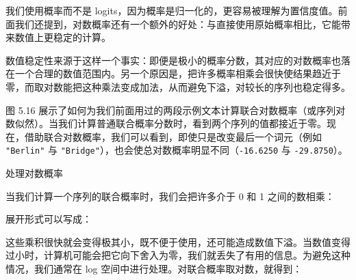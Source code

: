 
我们使用概率而不是 logits，因为概率是归一化的，更容易被理解为置信度值。前面我们还提到，对数概率还有一个额外的好处：与直接使用原始概率相比，它能带来数值上更稳定的计算。

数值稳定性来源于这样一个事实：即便是极小的概率分数，其对应的对数概率也落在一个合理的数值范围内。另一个原因是，把许多概率相乘会很快使结果趋近于零，而取对数能把这种乘法变成加法，从而避免下溢，对较长的序列也稳定得多。

图 5.16 展示了如何为我们前面用过的两段示例文本计算联合对数概率（或序列对数似然）。当我们计算普通联合概率分数时，看到两个序列的值都接近于零。现在，借助联合对数概率，我们可以看到，即使只是改变最后一个词元（例如 \texttt{"}\texttt{Berlin}\texttt{"} 与 \texttt{"}\texttt{Bridge}\texttt{"}），也会使总对数概率明显不同（\texttt{-16.6250} 与 \texttt{-29.8750}）。


\begin{mySidebar}{处理对数概率}

当我们计算一个序列的联合概率时，我们会把许多介于 0 和 1 之间的数相乘：

\end{mySidebar}


\begin{mySidebarBox}

展开形式可以写成：

\end{mySidebarBox}


\begin{mySidebarBox}

这些乘积很快就会变得极其小，既不便于使用，还可能造成数值下溢。当数值变得过小时，计算机可能会把它向下舍入为零，我们就丢失了有用的信息。为避免这种情况，我们通常在 log 空间中进行处理。对联合概率取对数，就得到：

\end{mySidebarBox}

